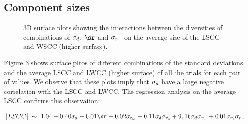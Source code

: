 \subsection{Component sizes}
\begin{figure}[hbt!]\centering
    \par

    \hfill

    \caption{3D surface plots showing the interactions between the diversities
    of combinations of $\sigma_d$, $\sr$ and $\sigma_{r_w}$ on the average size of the
    LSCC and WSCC (higher surface).}
    \label{figure}
\end{figure}
Figure 3 shows surface pltos of different combinations of the standard deviations
and the average LSCC and LWCC (higher surface) of all the trials for each pair of values.
We observe that these plots imply that $\sigma_d$ have a large negative correlation
with the LSCC and LWCC.
The regression analysis on the average LSCC confirms this observation:

\begin{gather}\label{eq:base}
    |LSCC| ~ \thicksim ~ 1.04 - 0.40\sd - 0.01\sr - 0.02\sw -
                0.11\ds + 9,16\dw + 0.01\ssw \label{three}\\
\end{gather}


